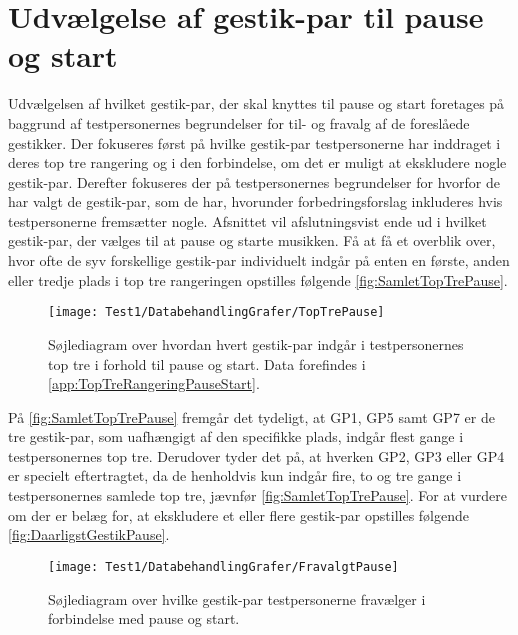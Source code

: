 \section{Udvælgelse af gestik-par til pause og start}
\label{TestresultaterPauseStart}
%
Udvælgelsen af hvilket gestik-par, der skal knyttes til pause og start foretages på baggrund af testpersonernes begrundelser for til- og fravalg af de foreslåede gestikker. Der fokuseres først på hvilke gestik-par testpersonerne har inddraget i deres top tre rangering og i den forbindelse, om det er muligt at ekskludere nogle gestik-par. Derefter fokuseres der på testpersonernes begrundelser for hvorfor de har valgt de gestik-par, som de har, hvorunder forbedringsforslag inkluderes hvis testpersonerne fremsætter nogle. Afsnittet vil afslutningsvist ende ud i hvilket gestik-par, der vælges til at pause og starte musikken.\blankline
%
Få at få et overblik over, hvor ofte de syv forskellige gestik-par individuelt indgår på enten en første, anden eller tredje plads i top tre rangeringen opstilles følgende \autoref{fig:SamletTopTrePause}. 
%
\begin{figure}[H]
	\centering
	\texttt{[image: Test1/DatabehandlingGrafer/TopTrePause]}
	\caption{Søjlediagram over hvordan hvert gestik-par indgår i testpersonernes top tre i forhold til pause og start. Data forefindes i \autoref{app:TopTreRangeringPauseStart}.}
	\label{fig:SamletTopTrePause}
\end{figure}
\noindent
% 
På \autoref{fig:SamletTopTrePause} fremgår det tydeligt, at GP1, GP5 samt GP7 er de tre gestik-par, som uafhængigt af den specifikke plads, indgår flest gange i testpersonernes top tre. Derudover tyder det på, at hverken GP2, GP3 eller GP4 er specielt eftertragtet, da de henholdvis kun indgår fire, to og tre gange i testpersonernes samlede top tre, jævnfør \autoref{fig:SamletTopTrePause}. For at vurdere om der er belæg for, at ekskludere et eller flere gestik-par opstilles følgende \autoref{fig:DaarligstGestikPause}.  
%
\begin{figure}[H]
	\centering
	\texttt{[image: Test1/DatabehandlingGrafer/FravalgtPause]}
	\caption{Søjlediagram over hvilke gestik-par testpersonerne fravælger i forbindelse med pause og start.}
	\label{fig:DaarligstGestikPause}
\end{figure}
\noindent
%
